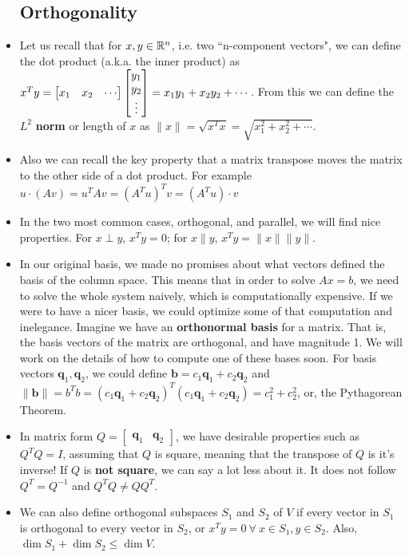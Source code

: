 \documentclass[11pt]{article}
\begin{document}
\begin{itemize}
\subsection{Orthogonality}
\item Let us recall that for $x, y \in \mathbb{R}^{n}$, i.e. two ``n-component vectors", we can define the dot product (a.k.a. the inner product) as $x^{T}y = \begin{bmatrix}
		x_{1} & x_{2} & \cdots
	\end{bmatrix} \begin{bmatrix} y_{1} \\ y_{2} \\ \vdots \end{bmatrix} = x_{1}y_{1}+ x_{2}y_{2} + \cdots$. From this we can define the $L^{2}$ \textbf{norm} or length of $x$ as $\|x\| = \sqrt{x^{T}x} = \sqrt{x_{1}^{2} + x_{2}^{2} + \cdots}$.
\item Also we can recall the key property that a matrix transpose moves the matrix to the other side of a dot product. For example $u \cdot (Av) = u^{T}Av = (A^{T}u)^{T}v = (A^{T}u)\cdot v$
\item In the two most common cases, orthogonal, and parallel, we will find nice properties. For $x \perp y$, $x^{T}y = 0$; for $x \parallel y$, $x^{T}y = \|x\| \|y\|$. 
\item In our original basis, we made no promises about what vectors defined the basis of the column space. This means that in order to solve $Ax=b$, we need to solve the whole system naively, which is computationally expensive. If we were to have a nicer basis, we could optimize some of that computation and inelegance. Imagine we have an \textbf{orthonormal basis} for a matrix. That is, the basis vectors of the matrix are orthogonal, and have magnitude 1. We will work on the details of how to compute one of these bases soon. For basis vectors $\mathbf{q}_{1}, \mathbf{q}_{2}$, we could define $\mathbf{b} = c_{1} \mathbf{q}_{1} + c_{2} \mathbf{q}_{2}$ and $\| \mathbf{b} \| = b^{T}b = (c_{1} \mathbf{q}_{1} + c_{2} \mathbf{q}_{2})^{T} (c_{1} \mathbf{q}_{1} + c_{2} \mathbf{q}_{2}) = c_{1}^{2} + c_{2}^{2}$, or, the Pythagorean Theorem.
\item In matrix form $Q = \begin{bmatrix}
		\mathbf{q}_{1} & \mathbf{q}_{2}
	\end{bmatrix}$, we have desirable properties such as $Q^{T}Q = I$, assuming that $Q$ is square, meaning that the transpose of $Q$ is it's inverse! If $Q$ is \textbf{not square}, we can say a lot less about it. It does not follow $Q^{T} = Q^{-1}$ and $Q^{T}Q \neq QQ^{T}$.
\item We can also define orthogonal subspaces $S_{1}$ and $S_{2}$ of $V$ if every vector in $S_{1}$ is orthogonal to every vector in $S_{2}$, or $x^{T}y = 0 \ \forall \ x \in S_{1}, y \in S_{2}$. Also, $\dim S_{1} + \dim S_{2} \leq \dim V$.

\end{itemize}
\end{document}
